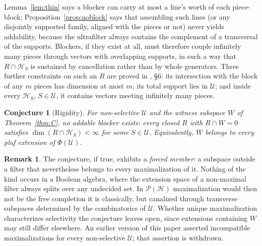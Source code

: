 \documentclass[11pt,reqno]{amsart}
\newtheorem{conjecture}[theorem]{Conjecture}
\theoremstyle{definition}
\newtheorem{remark}[theorem]{Remark}
\newcommand{\HH}{\mathcal{H}}
\newcommand{\PP}{\mathcal{P}}
\newcommand{\U}{\mathcal{U}}
\begin{document}
Lemma~\ref{lem:thin} says a blocker can carry at most a line's worth of each
piece-block; Proposition~\ref{prop:noblock} says that assembling such lines (or any
disjointly supported family, aligned with the pieces or not) never yields
addability, because the ultrafilter always contains the complement of a transversal
of the supports. Blockers, if they exist at all, must therefore couple infinitely
many pieces through vectors with overlapping supports, in such a way that
$R\cap\HH_S$ is sustained by cancellation rather than by whole generators. Three
further constraints on such an $R$ are proved in \cite{FWIV}, \S6: its intersection
with the block of any $m$ pieces has dimension at most $m$; its total support lies in
$\U$; and inside every $\HH_S$, $S\in\U$, it contains vectors meeting infinitely many
pieces.

\begin{conjecture}[Rigidity]\label{conj:rigidity}
For non-selective $\U$ and the witness subspace $W$ of Theorem~\ref{thm:C}, no
addable blocker exists: every closed $R$ with $R\cap W=0$ satisfies
$\dim(R\cap\HH_S)<\infty$ for some $S\in\U$. Equivalently, $W$ belongs to
\emph{every} pluf extension of $\Phi(\U)$.
\end{conjecture}

\begin{remark}
The conjecture, if true, exhibits a \emph{forced member}: a subspace outside a filter
that nevertheless belongs to every maximalization of it. Nothing of the kind occurs in
a Boolean algebra, where the extension space of a non-maximal filter always splits over
any undecided set. In $\PP(\HH)$ maximalization would then not be the free completion
it is classically, but canalized through transverse subspaces determined by the
combinatorics of $\U$. Whether unique maximalization characterizes selectivity the
conjecture leaves open, since extensions containing $W$ may still differ elsewhere. An
earlier version of this paper asserted incompatible maximalizations for every
non-selective $\U$; that assertion is withdrawn.
\end{remark}
\end{document}
